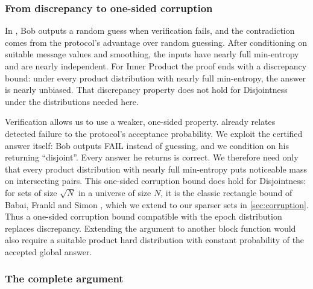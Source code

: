 \documentclass[11pt]{article}
\theoremstyle{plain}
\theoremstyle{definition}
\theoremstyle{remark}
\begin{document}
\subsubsection{From discrepancy to one-sided corruption}

In \cite{ko_omega_2026}, Bob outputs a random guess when verification fails, and the contradiction comes from the protocol's advantage over random guessing. After conditioning on suitable message values and smoothing, the inputs have nearly full min-entropy and are nearly independent. For Inner Product the proof ends with a discrepancy bound: under every product distribution with nearly full min-entropy, the answer is nearly unbiased. That discrepancy property does not hold for Disjointness under the distributions needed here.

Verification allows us to use a weaker, one-sided property. \cite[Remark~3.4]{ko_omega_2026} already relates detected failure to the protocol's acceptance probability. We exploit the certified answer itself: Bob outputs FAIL instead of guessing, and we condition on his returning ``disjoint''. Every answer he returns is correct. We therefore need only that every product distribution with nearly full min-entropy puts noticeable mass on intersecting pairs. This one-sided corruption bound does hold for Disjointness: for sets of size $\sqrt N$ in a universe of size $N$, it is the classic rectangle bound of Babai, Frankl and Simon \cite{babai_complexity_1986}, which we extend to our sparser sets in \cref{sec:corruption}. Thus a one-sided corruption bound compatible with the epoch distribution replaces discrepancy. Extending the argument to another block function would also require a suitable product hard distribution with constant probability of the accepted global answer.

\subsubsection{The complete argument}
\end{document}
